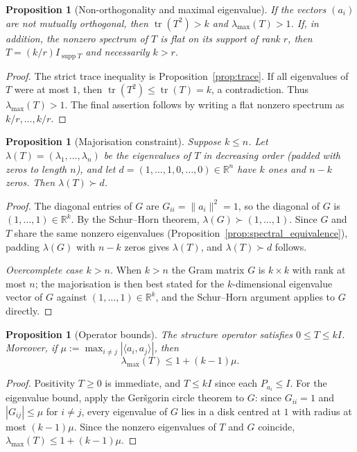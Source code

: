 \documentclass[
  twocolumn,
  aps,
  pra,
  floatfix,
  amsmath,amssymb,
  longbibliography
]{revtex4-2}
\newtheorem{proposition}[theorem]{Proposition}
\theoremstyle{definition}
\theoremstyle{remark}
\begin{document}
\begin{proposition}[Non-orthogonality and maximal eigenvalue]
\label{prop:strict}
If the vectors $(a_i)$ are not mutually orthogonal, then
$\operatorname{tr}(T^2)>k$ and $\lambda_{\max}(T)>1$.  If, in addition,
the nonzero spectrum of $T$ is flat on its support of rank $r$, then
$T=(k/r)I_{\operatorname{supp}T}$ and necessarily $k>r$.
\end{proposition}

\begin{proof}
The strict trace inequality is Proposition~\ref{prop:trace}.  If all
eigenvalues of $T$ were at most $1$, then
$\operatorname{tr}(T^2)\le \operatorname{tr}(T)=k$, a contradiction.
Thus $\lambda_{\max}(T)>1$.  The final assertion follows by writing a
flat nonzero spectrum as $k/r,\ldots,k/r$.
\end{proof}

\begin{proposition}[Majorisation constraint]\label{prop:maj}
Suppose $k\le n$.  Let $\lambda(T)=(\lambda_1,\ldots,\lambda_n)$ be
the eigenvalues of $T$ in decreasing order (padded with zeros to
length $n$), and let $d=(1,\ldots,1,0,\ldots,0)\in\mathbb{R}^n$ have
$k$ ones and $n-k$ zeros.  Then $\lambda(T)\succ d$.
\end{proposition}

\begin{proof}
The diagonal entries of $G$ are $G_{ii}=\|a_i\|^2=1$, so the diagonal
of $G$ is $(1,\ldots,1)\in\mathbb{R}^k$.  By the Schur--Horn theorem,
$\lambda(G)\succ(1,\ldots,1)$.  Since $G$ and $T$ share the same
nonzero eigenvalues
(Proposition~\ref{prop:spectral_equivalence}), padding $\lambda(G)$
with $n-k$ zeros gives $\lambda(T)$, and $\lambda(T)\succ d$ follows.

\smallskip\noindent\textit{Overcomplete case $k>n$.}  When $k>n$ the
Gram matrix $G$ is $k\times k$ with rank at most $n$; the
majorisation is then best stated for the $k$-dimensional eigenvalue
vector of $G$ against $(1,\ldots,1)\in\mathbb{R}^k$, and the
Schur--Horn argument applies to $G$ directly.
\end{proof}

\begin{proposition}[Operator bounds]\label{prop:bounds}
The structure operator satisfies $0\le T\le kI$.  Moreover, if
$\mu:=\max_{i\neq j}|\langle a_i,a_j\rangle|$, then
\[
  \lambda_{\max}(T)\le 1+(k-1)\mu.
\]
\end{proposition}

\begin{proof}
Positivity $T\ge 0$ is immediate, and $T\le kI$ since each
$P_{a_i}\le I$.  For the eigenvalue bound, apply the Ger\v{s}gorin
circle theorem to $G$: since $G_{ii}=1$ and $|G_{ij}|\le\mu$ for
$i\neq j$, every eigenvalue of $G$ lies in a disk centred at $1$ with
radius at most $(k-1)\mu$.  Since the nonzero eigenvalues of $T$ and
$G$ coincide, $\lambda_{\max}(T)\le 1+(k-1)\mu$.
\end{proof}
\end{document}
